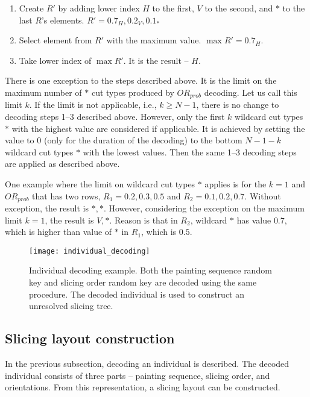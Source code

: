 \begin{enumerate}
    \item Create $R'$ by adding lower index $H$ to the first, $V$ to the second, and $*$ to the last $R$'s elements.
    $R' = 0.7_H, 0.2_V, 0.1_*$
    \item Select element from $R'$ with the maximum value. $\max R' = 0.7_H$.
    \item Take lower index of $\max R'$.
    It is the result – $H$.
\end{enumerate}

There is one exception to the steps described above.
It is the limit on the maximum number of $*$ cut types produced by $OR_{prob}$ decoding.
Let us call this limit $k$.
If the limit is not applicable, i.e., $k \geq N-1$, there is no change to decoding steps 1--3 described above.
However, only the first $k$ wildcard cut types $*$ with the highest value are considered if applicable.
It is achieved by setting the value to $0$ (only for the duration of the decoding) to the bottom $N-1-k$ wildcard cut types $*$ with the lowest values.
Then the same 1--3 decoding steps are applied as described above.

One example where the limit on wildcard cut types $*$ applies is for the $k=1$ and $OR_{prob}$ that has two rows, $R_1 = 0.2, 0.3, 0.5$ and $R_2 = 0.1, 0.2, 0.7$.
Without exception, the result is $*, *$.
However, considering the exception on the maximum limit $k=1$, the result is $V, *$.
Reason is that in $R_2$, wildcard $*$ has value $0.7$,
which is higher than value of $*$ in $R_1$, which is $0.5$.

\begin{figure}[h!]
    \texttt{[image: individual\_decoding]}
    \caption[Individual decoding example]{
        Individual decoding example. Both the painting sequence random key and slicing order random key
        are decoded using the same procedure.
        The decoded individual is used to construct an unresolved slicing tree. }
    \label{fig:individual-decoding}
\end{figure}

\subsection{Slicing layout construction}\label{subsec:slicing-tree-construction}
In the previous subsection, decoding an individual is described.
The decoded individual consists of three parts – painting sequence, slicing order, and orientations.
From this representation, a slicing layout can be constructed.\\


